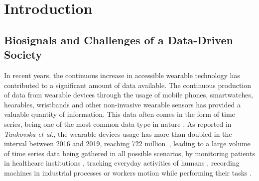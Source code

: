 
%

\chapter{Introduction}
\label{cha:introduction}



\section{Biosignals and Challenges of a Data-Driven Society} 
\label{sub:motivation1}

In recent years, the continuous increase in accessible wearable technology has contributed to a significant amount of data available. The continuous production of data from wearable devices through the usage of mobile phones, smartwatches, hearables, wristbands and other non-invasive wearable sensors has provided a valuable quantity of information. This data often comes in the form of time series, being one of the most common data type in nature \cite{puttinghuman}. As reported in \textit{Tankovska et al.}, the wearable devices usage has more than doubled in the interval between 2016 and 2019, reaching 722 million~\cite{tankovska_23_2020}, leading to a large volume of time series data being gathered in all possible scenarios, by monitoring patients in healthcare institutions \cite{cpd_medical_1, cpd_medical_2, cpd_medical_3, cpd_medical_4, dataset6, dataset7}, tracking everyday activities of humans \cite{cpd_har_1, cpd_har_2, review_1}, recording machines in industrial processes or workers motion while performing their tasks \cite{antonio, sara}. 

